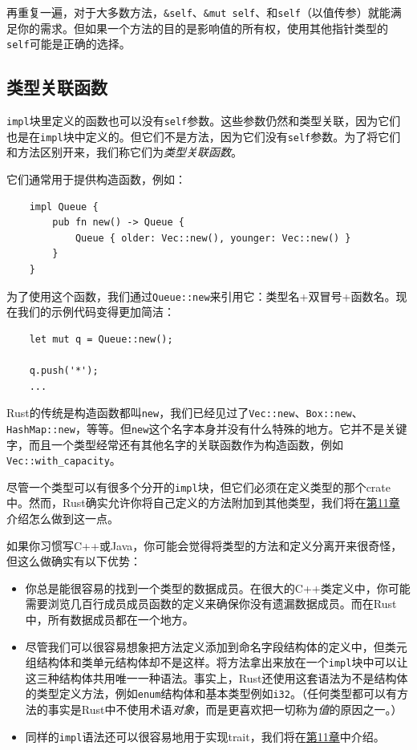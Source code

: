 再重复一遍，对于大多数方法，\texttt{\&self}、\texttt{\&mut self}、和\texttt{self}（以值传参）就能满足你的需求。但如果一个方法的目的是影响值的所有权，使用其他指针类型的\texttt{self}可能是正确的选择。

\subsection{类型关联函数}
\texttt{impl}块里定义的函数也可以没有\texttt{self}参数。这些参数仍然和类型关联，因为它们也是在\texttt{impl}块中定义的。但它们不是方法，因为它们没有\texttt{self}参数。为了将它们和方法区别开来，我们称它们为\emph{类型关联函数}。

它们通常用于提供构造函数，例如：
\begin{verbatim}
    impl Queue {
        pub fn new() -> Queue {
            Queue { older: Vec::new(), younger: Vec::new() }
        }
    }
\end{verbatim}

为了使用这个函数，我们通过\texttt{Queue::new}来引用它：类型名+双冒号+函数名。现在我们的示例代码变得更加简洁：
\begin{verbatim}
    let mut q = Queue::new();

    q.push('*');
    ...
\end{verbatim}

Rust的传统是构造函数都叫\texttt{new}，我们已经见过了\texttt{Vec::new}、\texttt{Box::new}、\texttt{HashMap::new}，等等。但\texttt{new}这个名字本身并没有什么特殊的地方。它并不是关键字，而且一个类型经常还有其他名字的关联函数作为构造函数，例如\texttt{Vec::with\_capacity}。

尽管一个类型可以有很多个分开的\texttt{impl}块，但它们必须在定义类型的那个crate中。然而，Rust确实允许你将自己定义的方法附加到其他类型，我们将在\hyperref[ch11]{第11章}介绍怎么做到这一点。

如果你习惯写C++或Java，你可能会觉得将类型的方法和定义分离开来很奇怪，但这么做确实有以下优势：
\begin{itemize}
    \item 你总是能很容易的找到一个类型的数据成员。在很大的C++类定义中，你可能需要浏览几百行成员成员函数的定义来确保你没有遗漏数据成员。而在Rust中，所有数据成员都在一个地方。
    \item 尽管我们可以很容易想象把方法定义添加到命名字段结构体的定义中，但类元组结构体和类单元结构体却不是这样。将方法拿出来放在一个\texttt{impl}块中可以让这三种结构体共用唯一一种语法。事实上，Rust还使用这套语法为不是结构体的类型定义方法，例如\texttt{enum}结构体和基本类型例如\texttt{i32}。（任何类型都可以有方法的事实是Rust中不使用术语\emph{对象}，而是更喜欢把一切称为\emph{值}的原因之一。）
    \item 同样的\texttt{impl}语法还可以很容易地用于实现trait，我们将在\hyperref[ch11]{第11章}中介绍。
\end{itemize}

